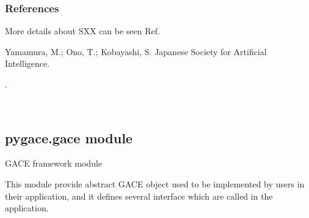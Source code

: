 \documentclass[letterpaper,10pt,english]{sphinxmanual}
\begin{document}
\begin{fulllineitems}
\begin{quote}
\begin{description}
\end{description}\end{quote}
\subsubsection*{References}

\sphinxAtStartPar
More details about SXX can be seen Ref. %
\begin{footnote}[6]\sphinxAtStartFootnote
Yamamura, M.; Ono, T.; Kobayashi, S. Japanese Society for Artificial
Intelligence.
%
\end{footnote}.

\end{fulllineitems}


\begin{fulllineitems}
\label{\detokenize{pygace:pygace.ga.transfer_from}}~
\end{fulllineitems}



\subsection{pygace.gace module}
\label{\detokenize{pygace:module-pygace.gace}}\label{\detokenize{pygace:pygace-gace-module}}
\sphinxAtStartPar
GACE framework module

\sphinxAtStartPar
This module provide abstract GACE object used to be implemented by users in
their application, and it defines several interface which are called in
the application.
\end{document}
